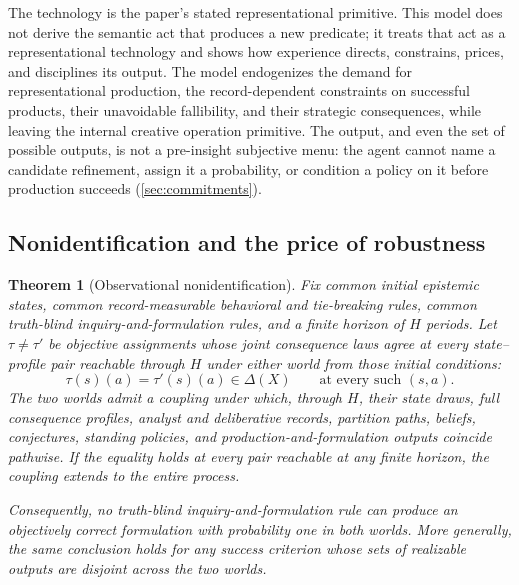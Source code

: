 \documentclass[11pt]{article}
\newtheorem{theorem}[assumption]{Theorem}
\theoremstyle{definition}
\begin{document}
The technology is the paper's stated representational primitive.
This model does not derive the semantic act that produces a new predicate; it treats that act as a representational technology and shows how experience directs, constrains, prices, and disciplines its output.
The model endogenizes the demand for representational production, the record-dependent constraints on successful products, their unavoidable fallibility, and their strategic consequences, while leaving the internal creative operation primitive.
The output, and even the set of possible outputs, is not a pre-insight subjective menu: the agent cannot name a candidate refinement, assign it a probability, or condition a policy on it before production succeeds (\cref{sec:commitments}).

\subsection{Nonidentification and the price of robustness}

\begin{theorem}[Observational nonidentification]
\label{thm:nonidentification}
Fix common initial epistemic states, common record-measurable behavioral and tie-breaking rules, common truth-blind inquiry-and-formulation rules, and a finite horizon of $H$ periods.
Let $\tau\neq\tau'$ be objective assignments whose \emph{joint} consequence laws agree at every state--profile pair reachable through $H$ under either world from those initial conditions:
\[
\tau(s)(a)=\tau'(s)(a)\in\Delta(X)
\qquad
\text{at every such $(s,a)$.}
\]
The two worlds admit a coupling under which, through $H$, their state draws, full consequence profiles, analyst and deliberative records, partition paths, beliefs, conjectures, standing policies, and production-and-formulation outputs coincide pathwise.
If the equality holds at every pair reachable at any finite horizon, the coupling extends to the entire process.

Consequently, no truth-blind inquiry-and-formulation rule can produce an objectively correct formulation with probability one in both worlds.
More generally, the same conclusion holds for any success criterion whose sets of realizable outputs are disjoint across the two worlds.
\end{theorem}
\end{document}
